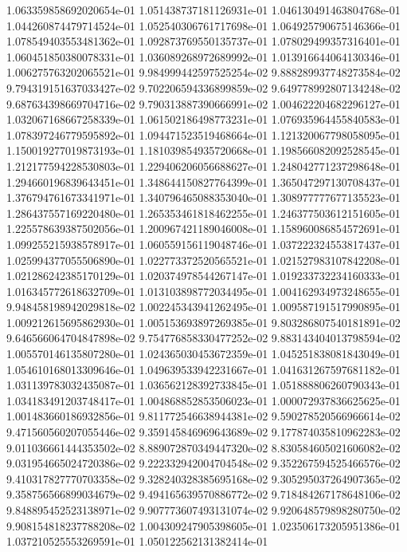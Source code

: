 1.063359858692020654e-01
1.051438737181126931e-01
1.046130491463804768e-01
1.044260874479714524e-01
1.052540306761717698e-01
1.064925790675146366e-01
1.078549403553481362e-01
1.092873769550135737e-01
1.078029499357316401e-01
1.060451850380078331e-01
1.036089268972689992e-01
1.013916644064130346e-01
1.006275763202065521e-01
9.984999442597525254e-02
9.888289937748273584e-02
9.794319151637033427e-02
9.702206594336899859e-02
9.649778992807134248e-02
9.687634398669704716e-02
9.790313887390666991e-02
1.004622204682296127e-01
1.032067168667258339e-01
1.061502186498773231e-01
1.076935964455840583e-01
1.078397246779595892e-01
1.094471523519468664e-01
1.121320067798058095e-01
1.150019277019873193e-01
1.181039854935720668e-01
1.198566082092528545e-01
1.212177594228530803e-01
1.229406206056688627e-01
1.248042771237298648e-01
1.294660196839643451e-01
1.348644150827764399e-01
1.365047297130708437e-01
1.376794761673341971e-01
1.340796465088353040e-01
1.308977777677135523e-01
1.286437557169220480e-01
1.265353461818462255e-01
1.246377503612151605e-01
1.225578639387502056e-01
1.200967421189046008e-01
1.158960086854572691e-01
1.099255215938578917e-01
1.060559156119048746e-01
1.037222324553817437e-01
1.025994377055506890e-01
1.022773372520565521e-01
1.021527983107842208e-01
1.021286242385170129e-01
1.020374978544267147e-01
1.019233732234160333e-01
1.016345772618632709e-01
1.013103898772034495e-01
1.004162934973248655e-01
9.948458198942029818e-02
1.002245343941262495e-01
1.009587191517990895e-01
1.009212615695862930e-01
1.005153693897269385e-01
9.803286807540181891e-02
9.646566064704847898e-02
9.754776858330477252e-02
9.883143404013798594e-02
1.005570146135807280e-01
1.024365030453672359e-01
1.045251838081843049e-01
1.054610168013309646e-01
1.049639533942231667e-01
1.041631267597681182e-01
1.031139783032435087e-01
1.036562128392733845e-01
1.051888806260790343e-01
1.034183491203748417e-01
1.004868852853506023e-01
1.000072937836625625e-01
1.001483660186932856e-01
9.811772546638944381e-02
9.590278520566966614e-02
9.471560560207055446e-02
9.359145846969643689e-02
9.177874035810962283e-02
9.011036661444353502e-02
8.889072870349447320e-02
8.830584605021606082e-02
9.031954665024720386e-02
9.222332942004704548e-02
9.352267594525466576e-02
9.410317827770703358e-02
9.328240328385695168e-02
9.305295037264907365e-02
9.358756566899034679e-02
9.494165639570886772e-02
9.718484267178648106e-02
9.848895452523138971e-02
9.907773607493131074e-02
9.920648579898280750e-02
9.908154818237788208e-02
1.004309247905398605e-01
1.023506173205951386e-01
1.037210525553269591e-01
1.050122562131382414e-01
